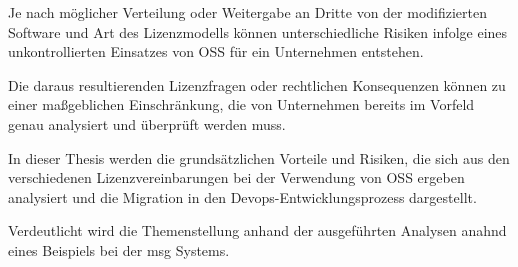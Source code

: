 Je nach möglicher Verteilung oder Weitergabe an Dritte von der modifizierten Software und Art des Lizenzmodells können unterschiedliche Risiken infolge eines unkontrollierten Einsatzes von OSS für ein Unternehmen entstehen.

Die daraus resultierenden Lizenzfragen oder rechtlichen Konsequenzen können zu einer maßgeblichen Einschränkung, die von Unternehmen bereits im Vorfeld genau analysiert und überprüft werden muss.  

In dieser Thesis werden die grundsätzlichen Vorteile und Risiken, die sich aus den verschiedenen Lizenzvereinbarungen bei der Verwendung von OSS ergeben analysiert und die Migration in den Devops-Entwicklungsprozess dargestellt.

Verdeutlicht wird die Themenstellung anhand der ausgeführten Analysen anahnd eines Beispiels bei der msg Systems.

